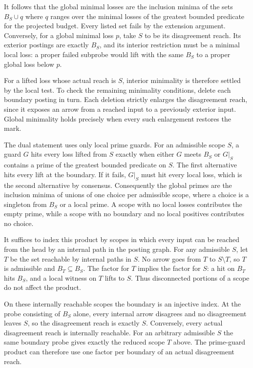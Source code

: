 It follows that the global minimal losses are
the inclusion minima of the sets $B_S\cup q$
where $q$ ranges over the minimal losses of
the greatest bounded predicate for the
projected budget. Every listed set fails by
the extension argument. Conversely, for a
global minimal loss $p$, take $S$ to be its
disagreement reach. Its exterior postings are
exactly $B_S$, and its interior restriction
must be a minimal local loss: a proper failed
subprobe would lift with the same $B_S$ to
a proper global loss below $p$.

For a lifted loss whose actual reach is $S$,
interior minimality is therefore settled by
the local test. To check the remaining
minimality conditions, delete each boundary
posting in turn. Each deletion strictly
enlarges the disagreement reach, since it
exposes an arrow from a reached input to a
previously exterior input. Global minimality
holds precisely when every such enlargement
restores the mark.

The dual statement uses only local prime guards.
For an admissible scope $S$, a guard $G$ hits
every loss lifted from $S$ exactly when either
$G$ meets $B_S$ or $G|_S$ contains a prime of the
greatest bounded predicate on $S$. The first
alternative hits every lift at the boundary.
If it fails, $G|_S$ must hit every local loss,
which is the second alternative by consensus.
Consequently the global primes are the inclusion
minima of unions of one choice per admissible
scope, where a choice is a singleton from $B_S$
or a local prime. A scope with no local losses
contributes the empty prime, while a scope
with no boundary and no local positives
contributes no choice.

It suffices to index this product by scopes in
which every input can be reached from the head
by an internal path in the posting graph.
For any admissible $S$, let $T$ be the set
reachable by internal paths in $S$. No arrow
goes from $T$ to $S\setminus T$, so $T$ is
admissible and $B_T\subseteq B_S$. The factor
for $T$ implies the factor for $S$: a hit on
$B_T$ hits $B_S$, and a local witness on $T$
lifts to $S$. Thus disconnected portions of
a scope do not affect the product.

On these internally reachable scopes the
boundary is an injective index. At the probe
consisting of $B_S$ alone, every internal arrow
disagrees and no disagreement leaves $S$, so
the disagreement reach is exactly $S$. Conversely,
every actual disagreement reach is internally
reachable. For an arbitrary admissible $S$ the
same boundary probe gives exactly the reduced
scope $T$ above. The prime-guard product can
therefore use one factor per boundary of an
actual disagreement reach.

